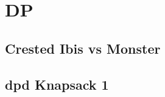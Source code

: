 \section{DP}
        \subsection{Crested Ibis vs Monster}
                
        \subsection{dpd Knapsack 1}
                
%                 
%                 
%                 
%                 
%                 
%                 
%                 
